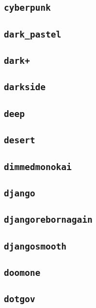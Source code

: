 \subsection{\texttt{cyberpunk}}
\newpage
\subsection{\texttt{dark\_pastel}}
\newpage
\subsection{\texttt{dark+}}
\newpage
\subsection{\texttt{darkside}}
\newpage
\subsection{\texttt{deep}}
\newpage
\subsection{\texttt{desert}}
\newpage
\subsection{\texttt{dimmedmonokai}}
\newpage
\subsection{\texttt{django}}
\newpage
\subsection{\texttt{djangorebornagain}}
\newpage
\subsection{\texttt{djangosmooth}}
\newpage
\subsection{\texttt{doomone}}
\newpage
\subsection{\texttt{dotgov}}
\newpage
